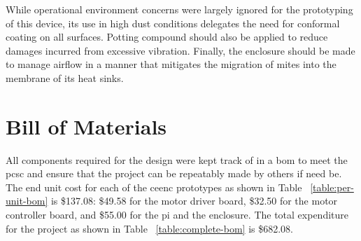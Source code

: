 While operational environment concerns were largely ignored for the prototyping of this device, its use in high dust conditions delegates the need for conformal coating on all surfaces.
Potting compound should also be applied to reduce damages incurred from excessive vibration.
Finally, the enclosure should be made to manage airflow in a manner that mitigates the migration of mites into the membrane of its heat sinks.

\section{Bill of Materials}
All components required for the design were kept track of in a \gls{bom} to meet the \gls{pcsc} and ensure that the project can be repeatably made by others if need be.
The end unit cost for each of the \gls{ceenc} prototypes as shown in Table ~\ref{table:per-unit-bom} is \$137.08: \$49.58 for the motor driver board, \$32.50 for the motor controller board, and \$55.00 for the \gls{pi} and the enclosure.
The total expenditure for the project as shown in Table ~\ref{table:complete-bom} is \$682.08.